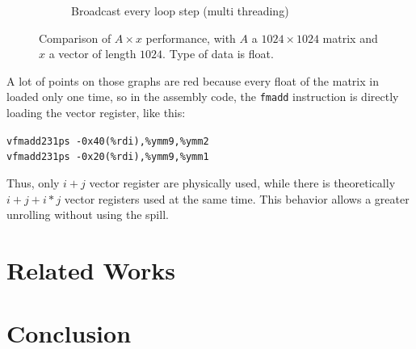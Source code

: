 \documentclass{article}
\begin{document}
\begin{figure}[h!]
\begin{subfigure}[h]{0.5\textwidth}
  \caption{Broadcast every loop step (multi threading)}
  \end{subfigure}
  
  \caption{Comparison of $A\times x$ performance, with $A$ a $1024\times1024$ matrix and $x$ a vector of length $1024$. Type of data is float.}
  \label{fig:matvec_comp}
\end{figure}


A lot of points on those graphs are red because every float of the matrix in loaded only one time, so in the assembly code, the \texttt{fmadd} instruction is directly loading the vector register, like this:

\begin{center}
  \texttt{vfmadd231ps -0x40(\%rdi),\%ymm9,\%ymm2}\\
  \texttt{vfmadd231ps -0x20(\%rdi),\%ymm9,\%ymm1}
\end{center}

Thus, only $i+j$ vector register are physically used, while there is theoretically $i+j+i*j$ vector registers used at the same time. This behavior allows a greater unrolling without using the spill.


\section{Related Works}
\section{Conclusion}
\label{sec:conclusion}


\end{document}

